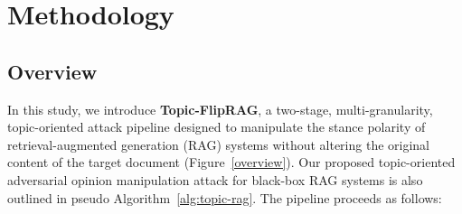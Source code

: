 


\section{Methodology}

\subsection{Overview}

In this study, we introduce \textbf{Topic-FlipRAG}, a two-stage, multi-granularity, topic-oriented attack pipeline designed to manipulate the stance polarity of retrieval-augmented generation (RAG) systems without altering the original content of the target document (Figure~\ref{overview}). Our proposed topic-oriented adversarial opinion manipulation attack for black-box RAG systems is also outlined in pseudo Algorithm~\ref{alg:topic-rag}. The pipeline proceeds as follows:


